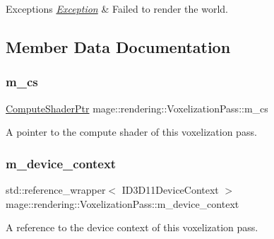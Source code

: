 \begin{DoxyExceptions}{Exceptions}
{\em \hyperlink{classmage_1_1_exception}{Exception}} & Failed to render the world. \\
\hline
\end{DoxyExceptions}


\subsection{Member Data Documentation}
\hypertarget{classmage_1_1rendering_1_1_voxelization_pass_ae3d844f54f0a3c1e2949b8cb38836eeb}{}\label{classmage_1_1rendering_1_1_voxelization_pass_ae3d844f54f0a3c1e2949b8cb38836eeb} 
\subsubsection{\texorpdfstring{m\+\_\+cs}{m\_cs}}
{\footnotesize\ttfamily \hyperlink{namespacemage_1_1rendering_ab3dc9f2114f2e9255b91d9c051da52ea}{Compute\+Shader\+Ptr} mage\+::rendering\+::\+Voxelization\+Pass\+::m\+\_\+cs\hspace{0.3cm}{\ttfamily [private]}}

A pointer to the compute shader of this voxelization pass. \hypertarget{classmage_1_1rendering_1_1_voxelization_pass_a44fc5652aed364651c7f58db658fc951}{}\label{classmage_1_1rendering_1_1_voxelization_pass_a44fc5652aed364651c7f58db658fc951} 
\subsubsection{\texorpdfstring{m\+\_\+device\+\_\+context}{m\_device\_context}}
{\footnotesize\ttfamily std\+::reference\+\_\+wrapper$<$ I\+D3\+D11\+Device\+Context $>$ mage\+::rendering\+::\+Voxelization\+Pass\+::m\+\_\+device\+\_\+context\hspace{0.3cm}{\ttfamily [private]}}

A reference to the device context of this voxelization pass. \hypertarget{classmage_1_1rendering_1_1_voxelization_pass_ac6161a5ea8a4203c4026afecf90755d4}{}\label{classmage_1_1rendering_1_1_voxelization_pass_ac6161a5ea8a4203c4026afecf90755d4} 
